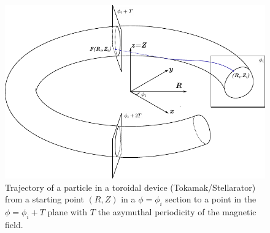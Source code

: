 \begin{figure}[H]
    \centering
    \includegraphics{images/theory/poincare-torus.pdf}
    \caption{Trajectory of a particle in a toroidal device (Tokamak/Stellarator) from a starting point $(R, Z)$ in a $\phi = \phi_i$ section to a point in the $\phi = \phi_i + T$ plane with $T$ the azymuthal periodicity of the magnetic field.}
    \label{fig:th-poincare-map}
\end{figure}

